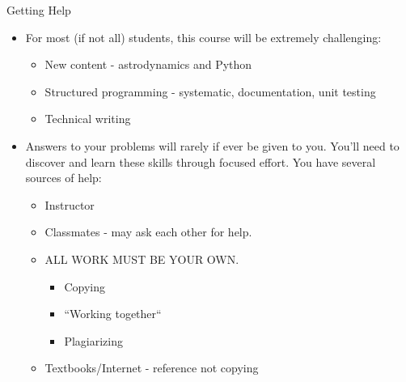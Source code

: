 \documentclass[11pt,professionalfonts]{beamer}
\begin{document}
\begin{frame}{Getting Help}
    \begin{itemize}
        \item For most (if not all) students, this course will be extremely challenging:
            \begin{itemize}
                \item New content - astrodynamics and Python
                \item Structured programming - systematic, documentation, unit testing
                \item Technical writing 
            \end{itemize}
        \item Answers to your problems will rarely if ever be given to you. 
            You'll need to discover and learn these skills through focused effort.
            You have several sources of help:
            \begin{itemize}
                \item Instructor
                \item Classmates - may ask each other for help.
                \item ALL WORK MUST BE YOUR OWN.
                    \begin{itemize}
                        \item Copying
                        \item ``Working together``
                        \item Plagiarizing
                    \end{itemize}
                \item Textbooks/Internet - reference not copying
            \end{itemize}
    \end{itemize}
\end{frame}
\end{document}
